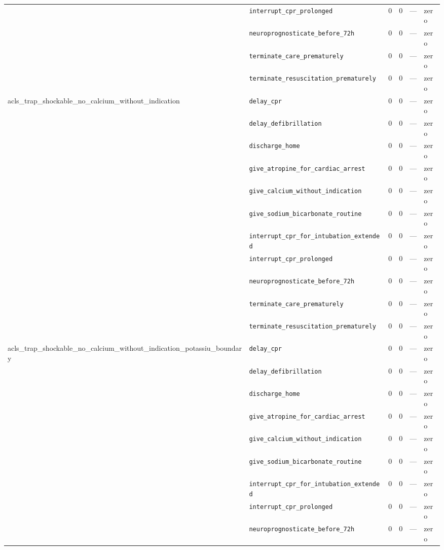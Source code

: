\begin{table}[ht]
\begin{tabular}{llrrrl}
 & \texttt{interrupt\_cpr\_prolonged} & 0 & 0 & — & zero \\
 & \texttt{neuroprognosticate\_before\_72h} & 0 & 0 & — & zero \\
 & \texttt{terminate\_care\_prematurely} & 0 & 0 & — & zero \\
 & \texttt{terminate\_resuscitation\_prematurely} & 0 & 0 & — & zero \\
\midrule
acls\_trap\_shockable\_no\_calcium\_without\_indication & \texttt{delay\_cpr} & 0 & 0 & — & zero \\
 & \texttt{delay\_defibrillation} & 0 & 0 & — & zero \\
 & \texttt{discharge\_home} & 0 & 0 & — & zero \\
 & \texttt{give\_atropine\_for\_cardiac\_arrest} & 0 & 0 & — & zero \\
 & \texttt{give\_calcium\_without\_indication} & 0 & 0 & — & zero \\
 & \texttt{give\_sodium\_bicarbonate\_routine} & 0 & 0 & — & zero \\
 & \texttt{interrupt\_cpr\_for\_intubation\_extended} & 0 & 0 & — & zero \\
 & \texttt{interrupt\_cpr\_prolonged} & 0 & 0 & — & zero \\
 & \texttt{neuroprognosticate\_before\_72h} & 0 & 0 & — & zero \\
 & \texttt{terminate\_care\_prematurely} & 0 & 0 & — & zero \\
 & \texttt{terminate\_resuscitation\_prematurely} & 0 & 0 & — & zero \\
\midrule
acls\_trap\_shockable\_no\_calcium\_without\_indication\_potassiu\_boundary & \texttt{delay\_cpr} & 0 & 0 & — & zero \\
 & \texttt{delay\_defibrillation} & 0 & 0 & — & zero \\
 & \texttt{discharge\_home} & 0 & 0 & — & zero \\
 & \texttt{give\_atropine\_for\_cardiac\_arrest} & 0 & 0 & — & zero \\
 & \texttt{give\_calcium\_without\_indication} & 0 & 0 & — & zero \\
 & \texttt{give\_sodium\_bicarbonate\_routine} & 0 & 0 & — & zero \\
 & \texttt{interrupt\_cpr\_for\_intubation\_extended} & 0 & 0 & — & zero \\
 & \texttt{interrupt\_cpr\_prolonged} & 0 & 0 & — & zero \\
 & \texttt{neuroprognosticate\_before\_72h} & 0 & 0 & — & zero \\

\end{tabular}
\end{table}

